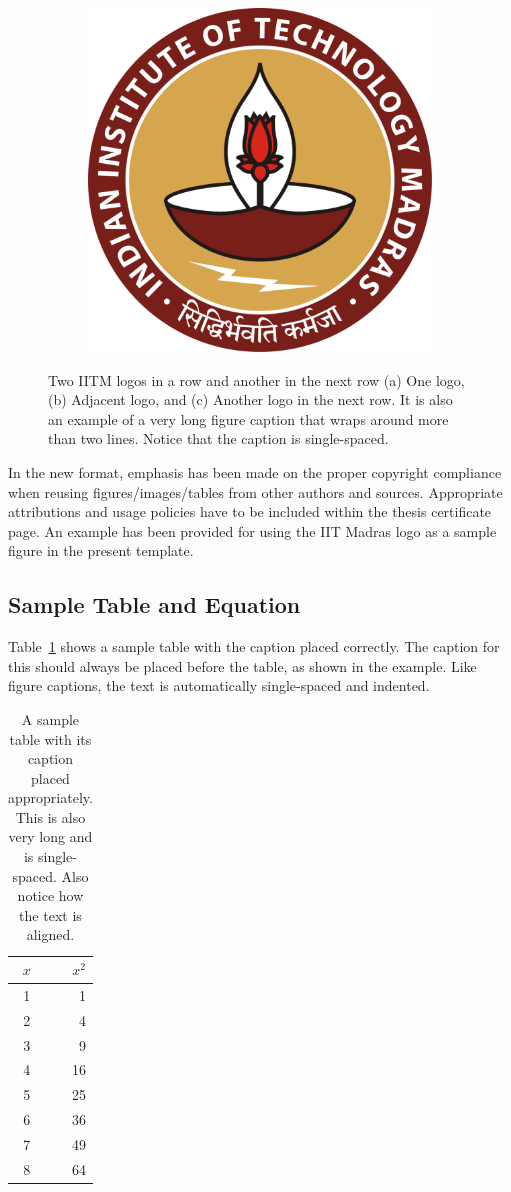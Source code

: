 \begin{figure}[htpb]
	\begin{subfigure}{1\textwidth}
		\centering
		\includegraphics[width=0.45\linewidth]{iitmlogo.eps}
		\caption{}
		\label{fig:iitmc}
\end{subfigure}
    \caption {Two IITM logos in a row and another in the next row (a) One logo, (b) Adjacent logo, and (c) Another logo in the next row. It is also an example of a very long figure caption that wraps around more than two lines. Notice that the caption is single-spaced.}
\label{fig:iitm}
\end{figure}

In the new format, emphasis has been made on the proper copyright compliance when reusing figures/images/tables from other authors and sources. Appropriate attributions and usage policies have to be included within the thesis certificate page. An example has been provided for using the IIT Madras logo as a sample figure in the present template.

\subsection{Sample Table and Equation}

Table~\ref{tab:sample} shows a sample table with the caption placed correctly. The caption for this should always be placed before the table, as shown in the example. Like figure captions, the text is automatically single-spaced and indented.

\begin{table}[htbp]
  \caption{A sample table with its caption placed appropriately. This is also very long and is single-spaced. Also notice how the text is aligned.}
  \begin{center}
  \begin{tabular}[c]{|c|r|} \hline
    $x$ & $x^2$ \\ \hline
    1  &  1   \\
    2  &  4  \\
    3  &  9  \\
    4  &  16  \\
    5  &  25  \\
    6  &  36  \\
    7  &  49  \\
    8  &  64  \\ \hline
  \end{tabular}
  \label{tab:sample}
  \end{center}
\end{table}

